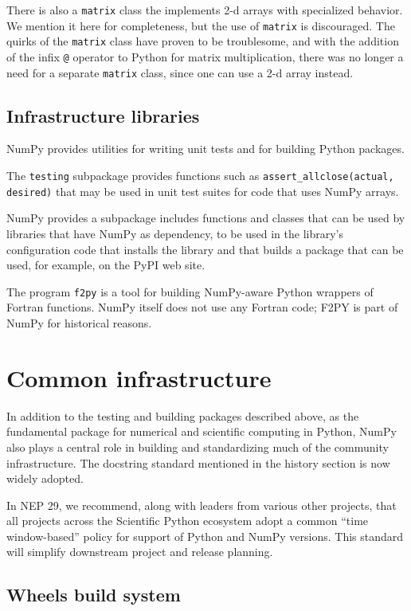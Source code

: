 \documentclass[fleqn,10pt]{wlscirep}
\newcommand{\code}[1]{\texttt{#1}}
\begin{document}
There is also a \code{matrix} class the implements 2-d arrays with
specialized behavior.  We mention it here for completeness, but the
use of \code{matrix} is discouraged.  The quirks of the \code{matrix}
class have proven to be troublesome, and with the addition of the
infix \code{@} operator to Python for matrix multiplication, there was no
longer a need for a separate \code{matrix} class, since one can
use a 2-d array instead.

\subsection*{Infrastructure libraries}

NumPy provides utilities for writing unit tests and for building Python
packages.

The \code{testing} subpackage provides functions such as
\code{assert\_allclose(actual, desired)} that may be used in unit
test suites for code that uses NumPy arrays.

NumPy provides a subpackage includes functions and classes
that can be used by libraries that have NumPy as dependency,
to be used in the library's configuration code that installs the
library and that builds a package that can be used, for example,
on the PyPI web site.

The program \code{f2py} is a tool for
building NumPy-aware Python wrappers of Fortran functions.
NumPy itself does not use any Fortran code;  F2PY is part of NumPy
for historical reasons.

\section*{Common infrastructure}

In addition to the testing and building packages described above,
as the fundamental package for numerical and scientific computing
in Python, NumPy also plays a central role in building and
standardizing much of the community infrastructure.
The docstring standard mentioned in the history section is now
widely adopted.

In NEP 29, we recommend, along with leaders from various other
projects, that all projects across the Scientific Python ecosystem
adopt a common ``time window-based'' policy for support of Python and
NumPy versions. This standard will simplify downstream project and
release planning.

\subsection*{Wheels build system}
\end{document}
